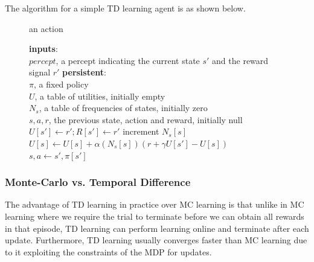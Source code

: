 \documentclass[11pt]{article}
\begin{document}
The algorithm for a simple TD learning agent is as shown below.

\begin{figure}[!htb]
\begin{algorithmic}[1]
 \Return an action

\State \textbf{inputs}: \\
\hspace*{\algorithmicindent} \hspace*{\algorithmicindent} $percept$, a percept indicating the current state $s'$ and the reward signal $r'$
\State \textbf{persistent}: \\
\hspace*{\algorithmicindent} \hspace*{\algorithmicindent} $\pi$, a fixed policy\\
\hspace*{\algorithmicindent} \hspace*{\algorithmicindent} $U$, a table of utilities, initially empty\\
\hspace*{\algorithmicindent} \hspace*{\algorithmicindent} $N_{s}$, a table of frequencies of  states, initially zero\\
\hspace*{\algorithmicindent} \hspace*{\algorithmicindent} $s, a, r$, the previous state, action and reward, initially null\\

 $U[s'] \leftarrow r'; R[s'] \leftarrow r'$ \EndIf
{}
\State increment $N_{s}[s]$
\State $U[s] \leftarrow U[s] + \alpha(N_s[s]) \left( r + \gamma U[s'] - U[s] \right)$
\EndIf
{} 
\Else $s,a \leftarrow s', \pi[s']$ \EndIf
\EndProcedure
\end{algorithmic}
\end{figure}

\subsubsection{Monte-Carlo vs. Temporal Difference}

The advantage of TD learning in practice over MC learning is that unlike in MC learning where we require the trial to terminate before we can obtain all rewards in that episode, TD learning can perform learning online and terminate after each update. Furthermore, TD learning usually converges faster than MC learning due to it exploiting the constraints of the MDP for updates.\\
\end{document}
